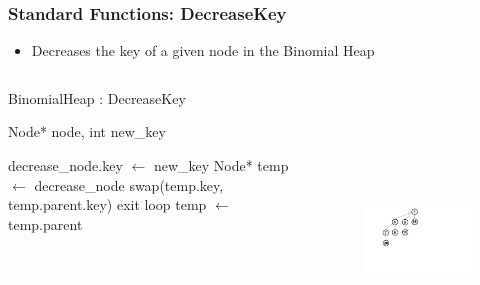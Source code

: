 \documentclass[13pt]{beamer}
\begin{document}
\begin{frame}
\frametitle{Standard Functions: DecreaseKey}
  \begin{itemize}
    \item Decreases the key of a given node in the Binomial Heap
  \end{itemize}

  \begin{columns}[T] %
    \begin{column}[T]{6cm} %
        \begin{algorithm}[H]
        \small
        \caption{BinomialHeap : DecreaseKey}
        \begin{algorithmic}
          \REQUIRE Node* node, int new\_key

          \STATE decrease\_node.key $\leftarrow$ new\_key
          \STATE Node* temp $\leftarrow$ decrease\_node
                \STATE swap(temp.key, temp.parent.key)
              \ELSE
                \STATE exit loop
              \ENDIF
              \STATE temp $\leftarrow$ temp.parent
          \ENDWHILE
        \end{algorithmic}
        \end{algorithm}
    \end{column}
    \begin{column}[T]{7.5cm} %
      \begin{figure}
        \includegraphics[height=8cm]{./img/decreasekeyD.png}
      \end{figure}
    \end{column}
  \end{columns}

\end{frame}
\end{document}
